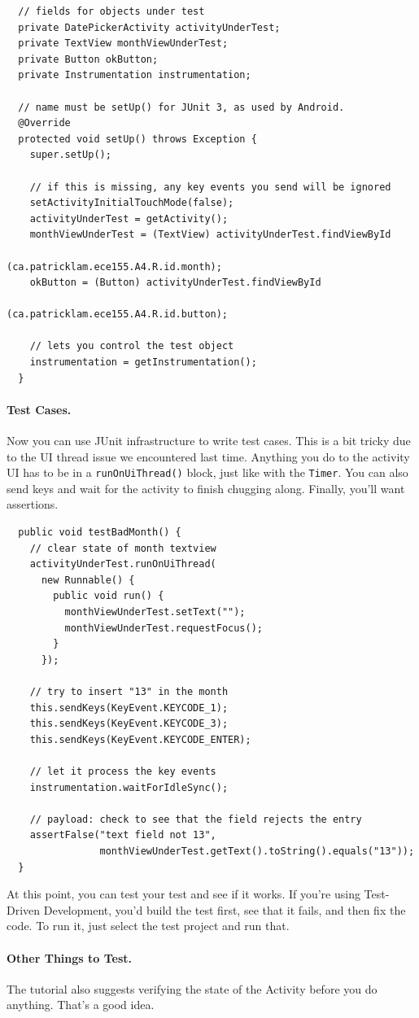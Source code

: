 {\small
\begin{verbatim}
  // fields for objects under test
  private DatePickerActivity activityUnderTest;
  private TextView monthViewUnderTest;
  private Button okButton;
  private Instrumentation instrumentation;

  // name must be setUp() for JUnit 3, as used by Android.
  @Override
  protected void setUp() throws Exception {
    super.setUp();

    // if this is missing, any key events you send will be ignored
    setActivityInitialTouchMode(false);
    activityUnderTest = getActivity();
    monthViewUnderTest = (TextView) activityUnderTest.findViewById
                                      (ca.patricklam.ece155.A4.R.id.month);
    okButton = (Button) activityUnderTest.findViewById
                                      (ca.patricklam.ece155.A4.R.id.button);

    // lets you control the test object
    instrumentation = getInstrumentation();
  }
\end{verbatim}
}

\paragraph{Test Cases.} Now you can use JUnit infrastructure to write test cases.
This is a bit tricky due to the UI thread issue we encountered last time.
Anything you do to the activity UI has to be in a {\tt runOnUiThread()} block,
just like with the {\tt Timer}. You can also send keys and wait for the activity
to finish chugging along. Finally, you'll want assertions.

{\small
\begin{verbatim}
  public void testBadMonth() {
    // clear state of month textview
    activityUnderTest.runOnUiThread(
      new Runnable() {
        public void run() {
          monthViewUnderTest.setText("");
          monthViewUnderTest.requestFocus();
        }
      });

    // try to insert "13" in the month
    this.sendKeys(KeyEvent.KEYCODE_1);
    this.sendKeys(KeyEvent.KEYCODE_3);
    this.sendKeys(KeyEvent.KEYCODE_ENTER);

    // let it process the key events
    instrumentation.waitForIdleSync();

    // payload: check to see that the field rejects the entry
    assertFalse("text field not 13", 
                monthViewUnderTest.getText().toString().equals("13"));
  }
\end{verbatim}
}

At this point, you can test your test and see if it works. If you're using
Test-Driven Development, you'd build the test first, see that it fails,
and then fix the code. To run it, just select the test project and run that.

\paragraph{Other Things to Test.}
The tutorial also suggests verifying the state of the Activity before
you do anything. That's a good idea.





